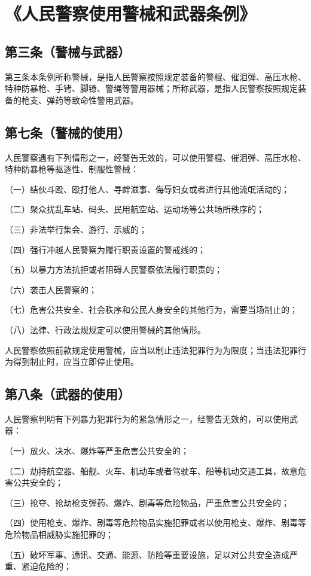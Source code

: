 \documentclass[utf-8,10pt]{ctexart}
\begin{document}
\section{《人民警察使用警械和武器条例》}
\subsection{第三条（警械与武器）}
第三条本条例所称警械，是指人民警察按照规定装备的警棍、催泪弹、高压水枪、特种防暴枪、手铐、脚镣、警绳等警用器械；所称武器，是指人民警察按照规定装备的枪支、弹药等致命性警用武器。
\subsection{第七条（警械的使用）}
人民警察遇有下列情形之一，经警告无效的，可以使用警棍、催泪弹、高压水枪、特种防暴枪等驱逐性、制服性警械：

（一）结伙斗殴、殴打他人、寻衅滋事、侮辱妇女或者进行其他流氓活动的；

（二）聚众扰乱车站、码头、民用航空站、运动场等公共场所秩序的；

（三）非法举行集会、游行、示威的；

（四）强行冲越人民警察为履行职责设置的警戒线的；

（五）以暴力方法抗拒或者阻碍人民警察依法履行职责的；

（六）袭击人民警察的；

（七）危害公共安全、社会秩序和公民人身安全的其他行为，需要当场制止的；

（八）法律、行政法规规定可以使用警械的其他情形。

人民警察依照前款规定使用警械，应当以制止违法犯罪行为为限度；当违法犯罪行为得到制止时，应当立即停止使用。
\subsection{第八条（武器的使用）}
人民警察判明有下列暴力犯罪行为的紧急情形之一，经警告无效的，可以使用武器：

（一）放火、决水、爆炸等严重危害公共安全的；

（二）劫持航空器、船舰、火车、机动车或者驾驶车、船等机动交通工具，故意危害公共安全的；

（三）抢夺、抢劫枪支弹药、爆炸、剧毒等危险物品，严重危害公共安全的；

（四）使用枪支、爆炸、剧毒等危险物品实施犯罪或者以使用枪支、爆炸、剧毒等危险物品相威胁实施犯罪的；

（五）破坏军事、通讯、交通、能源、防险等重要设施，足以对公共安全造成严重、紧迫危险的；
\end{document}

